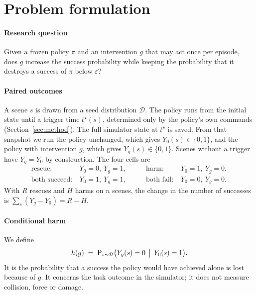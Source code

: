 \section{Problem formulation}\label{sec:problem}

\paragraph{Research question} Given a frozen policy $\pi$ and an intervention $g$ that may act once per episode, does $g$ increase the success probability while keeping the probability that it destroys a success of $\pi$ below $\varepsilon$?

\paragraph{Paired outcomes} A scene $s$ is drawn from a seed distribution $\mathcal{D}$. The policy runs from the initial state until a trigger time $t^\star(s)$, determined only by the policy's own commands (Section~\ref{sec:method}). The full simulator state at $t^\star$ is saved. From that snapshot we run the policy unchanged, which gives $Y_0(s)\in\{0,1\}$, and the policy with intervention $g$, which gives $Y_g(s)\in\{0,1\}$. Scenes without a trigger have $Y_g=Y_0$ by construction. The four cells are
\begin{equation}
\begin{aligned}
\text{rescue}: &\ Y_0=0,\ Y_g=1, & \qquad \text{harm}: &\ Y_0=1,\ Y_g=0,\\
\text{both succeed}: &\ Y_0=1,\ Y_g=1, & \qquad \text{both fail}: &\ Y_0=0,\ Y_g=0.
\end{aligned}
\end{equation}
With $R$ rescues and $H$ harms on $n$ scenes, the change in the number of successes is $\sum_s (Y_g-Y_0)=R-H$.

\paragraph{Conditional harm} We define
\begin{equation}
h(g) \;=\; \Pr_{s\sim\mathcal{D}}\bigl(Y_g(s)=0 \,\bigm|\, Y_0(s)=1\bigr).
\end{equation}
It is the probability that a success the policy would have achieved alone is lost because of $g$. It concerns the task outcome in the simulator; it does not measure collision, force or damage.

